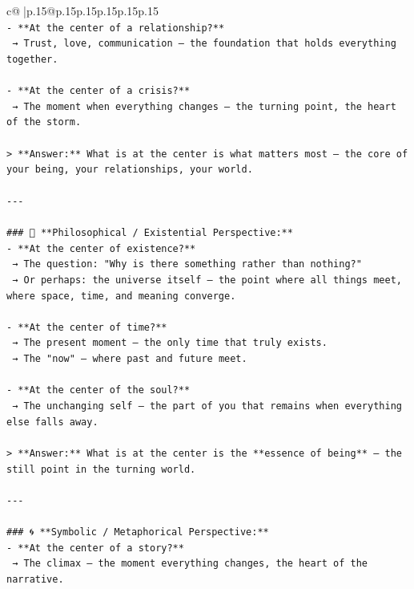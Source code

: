 \documentclass{article}
\begin{document}
{\begin{supertabular}{c@{$\;$}|p{.15\linewidth}@{}p{.15\linewidth}p{.15\linewidth}p{.15\linewidth}p{.15\linewidth}p{.15\linewidth}}
{{{\\ 
\texttt{{-} **At the center of a relationship?**  } \\
\texttt{  → Trust, love, communication — the foundation that holds everything together.} \\
\\ 
\texttt{{-} **At the center of a crisis?**  } \\
\texttt{  → The moment when everything changes — the turning point, the heart of the storm.} \\
\\ 
\texttt{> **Answer:** What is at the center is what matters most — the core of your being, your relationships, your world.} \\
\\ 
\texttt{{-}{-}{-}} \\
\\ 
\texttt{\#\#\# 🌌 **Philosophical / Existential Perspective:**} \\
\texttt{{-} **At the center of existence?**  } \\
\texttt{  → The question: "Why is there something rather than nothing?"  } \\
\texttt{  → Or perhaps: the universe itself — the point where all things meet, where space, time, and meaning converge.} \\
\\ 
\texttt{{-} **At the center of time?**  } \\
\texttt{  → The present moment — the only time that truly exists.  } \\
\texttt{  → The "now" — where past and future meet.} \\
\\ 
\texttt{{-} **At the center of the soul?**  } \\
\texttt{  → The unchanging self — the part of you that remains when everything else falls away.} \\
\\ 
\texttt{> **Answer:** What is at the center is the **essence of being** — the still point in the turning world.} \\
\\ 
\texttt{{-}{-}{-}} \\
\\ 
\texttt{\#\#\# 🌀 **Symbolic / Metaphorical Perspective:**} \\
\texttt{{-} **At the center of a story?**  } \\
\texttt{  → The climax — the moment everything changes, the heart of the narrative.} \\
}}}
\end{supertabular}}
\end{document}
